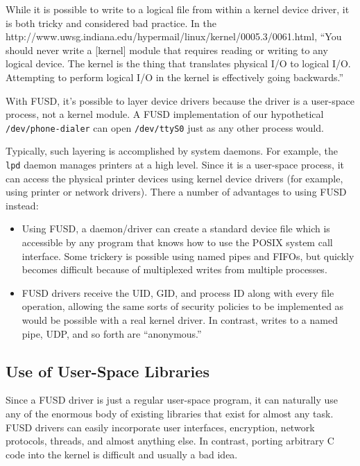 \documentclass{article}
\begin{document}
While it is possible to write to a logical file from within a kernel
device driver, it is both tricky and considered bad practice.  In the
{http://www.uwsg.indiana.edu/hypermail/linux/kernel/0005.3/0061.html},
``You should never write a [kernel] module that requires reading or
writing to any logical device. The kernel is the thing that translates
physical I/O to logical I/O. Attempting to perform logical I/O in the
kernel is effectively going backwards.''

With FUSD, it's possible to layer device drivers because the driver is
a user-space process, not a kernel module.  A FUSD implementation of
our hypothetical {\tt /dev/phone-dialer} can open {\tt /dev/ttyS0}
just as any other process would.

Typically, such layering is accomplished by system daemons.  For
example, the {\tt lpd} daemon manages printers at a high level.  Since
it is a user-space process, it can access the physical printer devices
using kernel device drivers (for example, using printer or network
drivers).  There a number of advantages to using FUSD instead:
\begin{itemize}
\item Using FUSD, a daemon/driver can create a standard device file
which is accessible by any program that knows how to use the POSIX
system call interface.  Some trickery is possible using named
pipes and FIFOs, but quickly becomes difficult because of multiplexed
writes from multiple processes.
\item FUSD drivers receive the UID, GID, and process ID along with
every file operation, allowing the same sorts of security policies to
be implemented as would be possible with a real kernel driver.  In
contrast, writes to a named pipe, UDP, and so forth are ``anonymous.''
\end{itemize}

\subsection{Use of User-Space Libraries}

Since a FUSD driver is just a regular user-space program, it can
naturally use any of the enormous body of existing libraries that
exist for almost any task.  FUSD drivers can easily incorporate user
interfaces, encryption, network protocols, threads, and almost
anything else.  In contrast, porting arbitrary C code into the kernel
is difficult and usually a bad idea.
\end{document}
